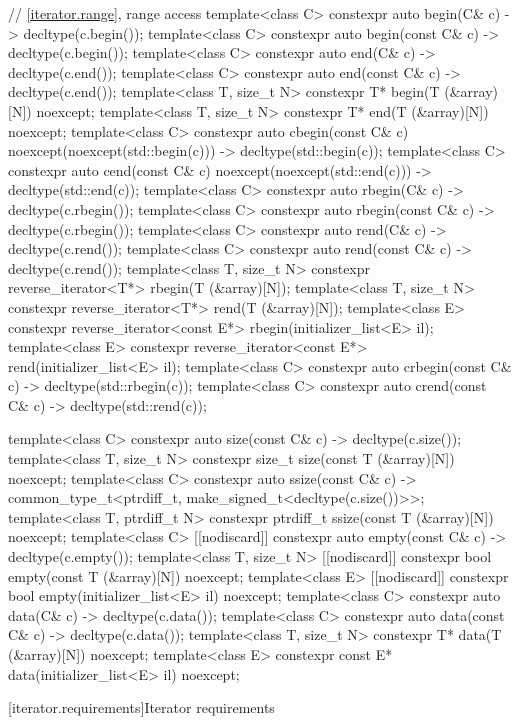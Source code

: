 \begin{codeblock}
{  // \ref{iterator.range}, range access
  template<class C> constexpr auto begin(C& c) -> decltype(c.begin());
  template<class C> constexpr auto begin(const C& c) -> decltype(c.begin());
  template<class C> constexpr auto end(C& c) -> decltype(c.end());
  template<class C> constexpr auto end(const C& c) -> decltype(c.end());
  template<class T, size_t N> constexpr T* begin(T (&array)[N]) noexcept;
  template<class T, size_t N> constexpr T* end(T (&array)[N]) noexcept;
  template<class C> constexpr auto cbegin(const C& c) noexcept(noexcept(std::begin(c)))
    -> decltype(std::begin(c));
  template<class C> constexpr auto cend(const C& c) noexcept(noexcept(std::end(c)))
    -> decltype(std::end(c));
  template<class C> constexpr auto rbegin(C& c) -> decltype(c.rbegin());
  template<class C> constexpr auto rbegin(const C& c) -> decltype(c.rbegin());
  template<class C> constexpr auto rend(C& c) -> decltype(c.rend());
  template<class C> constexpr auto rend(const C& c) -> decltype(c.rend());
  template<class T, size_t N> constexpr reverse_iterator<T*> rbegin(T (&array)[N]);
  template<class T, size_t N> constexpr reverse_iterator<T*> rend(T (&array)[N]);
  template<class E> constexpr reverse_iterator<const E*> rbegin(initializer_list<E> il);
  template<class E> constexpr reverse_iterator<const E*> rend(initializer_list<E> il);
  template<class C> constexpr auto crbegin(const C& c) -> decltype(std::rbegin(c));
  template<class C> constexpr auto crend(const C& c) -> decltype(std::rend(c));

  template<class C> constexpr auto size(const C& c) -> decltype(c.size());
  template<class T, size_t N> constexpr size_t size(const T (&array)[N]) noexcept;
  template<class C> constexpr auto ssize(const C& c)
    -> common_type_t<ptrdiff_t, make_signed_t<decltype(c.size())>>;
  template<class T, ptrdiff_t N> constexpr ptrdiff_t ssize(const T (&array)[N]) noexcept;
  template<class C> [[nodiscard]] constexpr auto empty(const C& c) -> decltype(c.empty());
  template<class T, size_t N> [[nodiscard]] constexpr bool empty(const T (&array)[N]) noexcept;
  template<class E> [[nodiscard]] constexpr bool empty(initializer_list<E> il) noexcept;
  template<class C> constexpr auto data(C& c) -> decltype(c.data());
  template<class C> constexpr auto data(const C& c) -> decltype(c.data());
  template<class T, size_t N> constexpr T* data(T (&array)[N]) noexcept;
  template<class E> constexpr const E* data(initializer_list<E> il) noexcept;
}
\end{codeblock}

[iterator.requirements]{Iterator requirements}

